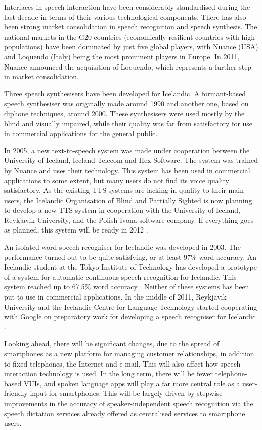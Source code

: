 \begin{multicols}{2}
Interfaces in speech interaction have been considerably standardised during the last decade in terms of their various technological components. There has also been strong market consolidation in speech recognition and speech synthesis. The national markets in the G20 countries (economically resilient countries with high populations) have been dominated by just five global players, with Nuance (USA) and Loquendo (Italy) being the most prominent players in Europe. In 2011, Nuance announced the acquisition of Loquendo, which represents a further step in market consolidation.

Three speech synthesisers have been developed for Icelandic. A formant-based speech synthesiser was originally made around 1990 and another one, based on diphone techniques, around 2000. These synthesisers were used mostly by the blind and visually impaired, while their quality was far from satisfactory for use in commercial applications for the general public.

In 2005, a new text-to-speech system was made under cooperation between the University of Iceland, Iceland Telecom and Hex Software. The system was trained by Nuance and uses their technology. This system has been used in commercial applications to some extent, but many users do not find its voice quality satisfactory. As the existing TTS systems are lacking in quality to their main users, the Icelandic Organisation of Blind and Partially Sighted is now planning to develop a new TTS system in cooperation with the University of Iceland, Reykjavik University, and the Polish Ivona software company. If everything goes as planned, this system will be ready in 2012 \cite{tal1}. 

An isolated word speech recogniser for Icelandic was developed in 2003. The performance turned out to be quite satisfying, or at least 97\% word accuracy. An Icelandic student at the Tokyo Institute of Technology has developed a prototype of a system for automatic continuous speech recognition for Icelandic. This system reached up to 67.5\% word accuracy \cite{hind1}. Neither of these systems has been put to use in commercial applications. In the middle of 2011, Reykjavik University and the Icelandic Centre for Language Technology started cooperating with Google on preparatory work for developing a speech recogniser for Icelandic \cite{alm1}.

Looking ahead, there will be significant changes, due to the spread of smartphones as a new platform for managing customer relationships, in addition to fixed telephones, the Internet and e-mail. This will also affect how speech interaction technology is used. In the long term, there will be fewer telephone-based VUIs, and spoken language apps will play a far more central role as a user-friendly input for smartphones. This will be largely driven by stepwise improvements in the accuracy of speaker-independent speech recognition via the speech dictation services already offered as centralised services to smartphone users.


\end{multicols}
